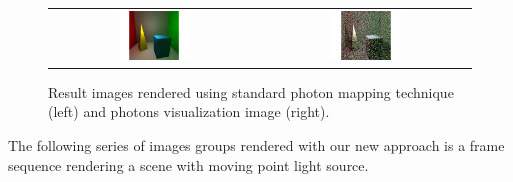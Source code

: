 \begin{figure}[htp]
\begin{center}
	\begin{tabular}{c | c}
		\includegraphics*[width=0.35\textwidth]{imgs/pq_ref.pdf} &
		\includegraphics*[width=0.35\textwidth]{imgs/pqv_ref.pdf}
	\end{tabular}
    \renewcommand{\thefigure}{\thechapter.\arabic{figure}}
    \caption[Rendered images and photons visualization with standard photon mapping technique]{Result images rendered using standard photon mapping technique (left) and photons visualization image (right).}
    \label{fig:pm_global}
\end{center}
\end{figure}

The following series of images groups rendered with our new approach is a frame sequence rendering a scene with moving point light source. %

